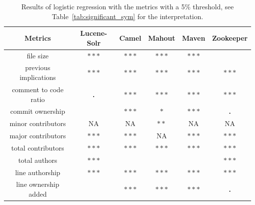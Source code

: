 \begin{table}[ht]
\centering
\caption{Results of logistic regression with the metrics with a 5\% threshold, see Table~\ref{tab:significant_sym} for the interpretation.}
\label{tab:logistic_regression5}
\begin{tabular}{|c|c|c|c|c|c|}
\hline
\textbf{Metrics}                 & \textbf{Lucene-Solr} & \textbf{Camel} & \textbf{Mahout} & \textbf{Maven}  & \textbf{Zookeeper} \\ \hline
file size                        & \textbf{$\ast\ast\ast$}         & \textbf{$\ast\ast\ast$}   & \textbf{$\ast\ast\ast$}    & \textbf{$\ast\ast\ast$}    &                    \\
previous implications            & \textbf{$\ast\ast\ast$}         & \textbf{$\ast\ast\ast$}   & \textbf{$\ast\ast\ast$}    & \textbf{$\ast\ast\ast$}    & \textbf{$\ast\ast\ast$}       \\
comment to code ratio            & \textbf{.}           & \textbf{$\ast\ast\ast$}   & \textbf{$\ast\ast\ast$}    & \textbf{$\ast\ast\ast$}    & \textbf{$\ast\ast\ast$}       \\
\hline
commit ownership                 &                      & \textbf{$\ast\ast\ast$}   & \textbf{$\ast$}      & \textbf{$\ast\ast\ast$}    & \textbf{.}         \\
minor contributors               & NA                   & NA             & \textbf{$\ast\ast$}     & NA              & NA                 \\
major contributors               & \textbf{$\ast\ast\ast$}         & \textbf{$\ast\ast\ast$}   & NA              & \textbf{$\ast\ast\ast$}    & \textbf{$\ast\ast\ast$}       \\
total contributors & \textbf{$\ast\ast\ast$} & \textbf{$\ast\ast\ast$} & \textbf{$\ast\ast\ast$} & \textbf{$\ast\ast\ast$} & \textbf{$\ast\ast\ast$} \\\hline
total authors                    & \textbf{$\ast\ast\ast$}         & \textbf{}      & \textbf{}       & \textbf{}       & \textbf{$\ast\ast\ast$}       \\
line authorship                  & \textbf{$\ast\ast\ast$}         & \textbf{$\ast\ast\ast$}   & \textbf{$\ast\ast\ast$}    & \textbf{$\ast\ast\ast$}    & \textbf{$\ast\ast\ast$}       \\ \hline
line ownership added             & \textbf{}            & \textbf{$\ast\ast\ast$}   & \textbf{$\ast\ast\ast$}    & \textbf{$\ast\ast\ast$}    & \textbf{.}         \\

\end{tabular}
\end{table}

